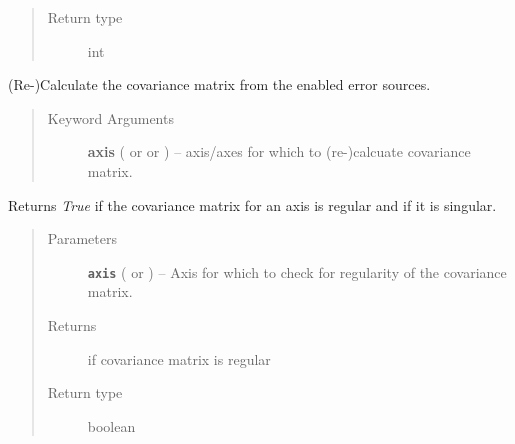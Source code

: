 \documentclass[a4paper,10pt,english]{sphinxmanual}
\begin{document}
\begin{fulllineitems}
\begin{fulllineitems}
\begin{quote}
\begin{description}
\item[{Return type}] \leavevmode
int

\end{description}\end{quote}

\end{fulllineitems}


\begin{fulllineitems}
\label{index:kafe.dataset.Dataset.calc_cov_mats}
(Re-)Calculate the covariance matrix from the enabled error sources.
\begin{quote}\begin{description}
\item[{Keyword Arguments}] \leavevmode
\textbf{axis} ( or  or ) --
axis/axes for which to (re-)calcuate covariance matrix.

\end{description}\end{quote}

\end{fulllineitems}


\begin{fulllineitems}
\label{index:kafe.dataset.Dataset.cov_mat_is_regular}
Returns \emph{True} if the covariance matrix for an axis is regular and
 if it is singular.
\begin{quote}\begin{description}
\item[{Parameters}] \leavevmode
\textbf{\texttt{axis}} ( or ) -- Axis for which to check for regularity of the covariance matrix.

\item[{Returns}] \leavevmode
{} if covariance matrix is regular

\item[{Return type}] \leavevmode
boolean

\end{description}\end{quote}

\end{fulllineitems}


\end{fulllineitems}
\end{document}
